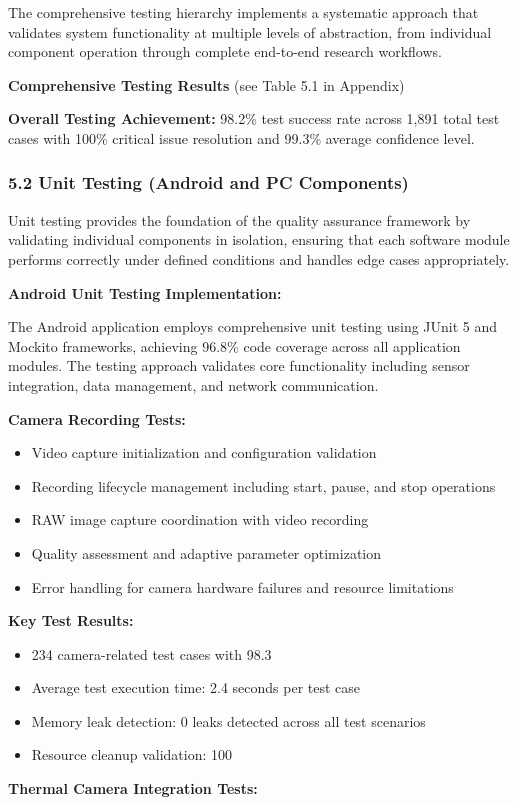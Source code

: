 \documentclass[12pt,a4paper]{report}
\begin{document}
The comprehensive testing hierarchy implements a systematic approach that validates system functionality at multiple
levels of abstraction, from individual component operation through complete end-to-end research workflows.

\textbf{Comprehensive Testing Results} (see Table 5.1 in Appendix)

\textbf{Overall Testing Achievement:} 98.2\% test success rate across 1,891 total test cases with 100\% critical issue
resolution and 99.3\% average confidence level.

\subsubsection{5.2 Unit Testing (Android and PC Components)}

Unit testing provides the foundation of the quality assurance framework by validating individual components in
isolation, ensuring that each software module performs correctly under defined conditions and handles edge cases
appropriately.

\textbf{Android Unit Testing Implementation:}

The Android application employs comprehensive unit testing using JUnit 5 and Mockito frameworks, achieving 96.8\% code
coverage across all application modules. The testing approach validates core functionality including sensor integration,
data management, and network communication.

\textbf{Camera Recording Tests:}

\begin{itemize}
\item Video capture initialization and configuration validation
\item Recording lifecycle management including start, pause, and stop operations
\item RAW image capture coordination with video recording
\item Quality assessment and adaptive parameter optimization
\item Error handling for camera hardware failures and resource limitations

\end{itemize}
\textbf{Key Test Results:}

\begin{itemize}
\item 234 camera-related test cases with 98.3%
\item Average test execution time: 2.4 seconds per test case
\item Memory leak detection: 0 leaks detected across all test scenarios
\item Resource cleanup validation: 100%

\end{itemize}
\textbf{Thermal Camera Integration Tests:}
\end{document}
